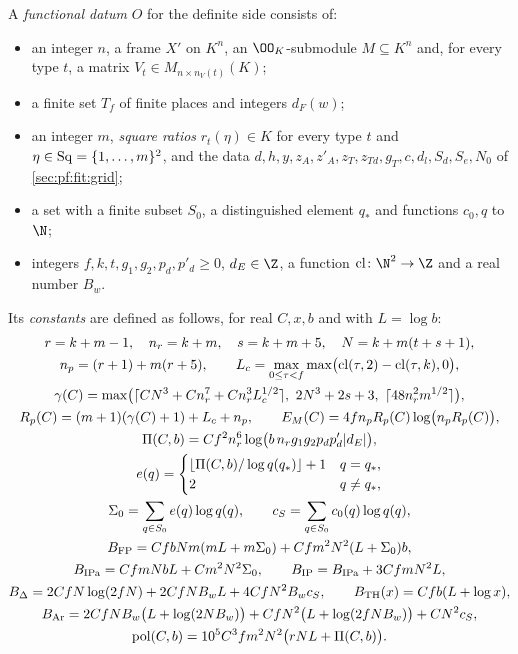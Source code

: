 \begin{definition}\label{pf:fit:fundata}
A \emph{functional datum} $O$ for the definite side consists of:
\begin{itemize}
\item an integer $n$, a frame $X'$ on $K^n$, an $\OO_K$-submodule $M\subseteq K^n$ and, for every type $t$, a matrix
$V_t\in M_{n\times n_V(t)}(K)$;
\item a finite set $T_f$ of finite places and integers $d_F(w)$;
\item an integer $m$, \emph{square ratios} $r_t(\eta)\in K$ for every type $t$ and $\eta\in\mathrm{Sq}=\{1,\dots,m\}^2$, and
the data $d,h,y,z_A,z'_A,z_T,z_{Td},g_T,c,d_l,S_d,S_e,N_0$ of \cref{sec:pf:fit:grid};
\item a set with a finite subset $S_0$, a distinguished element $q_*$ and functions $c_0,q$ to $\N$;
\item integers $f,k,t,g_1,g_2,p_d,p'_d\ge0$, $d_E\in\Z$, a function $\mathrm{cl}\colon\N^2\to\Z$ and a real number
$B_w$.
\end{itemize}
Its \emph{constants} are defined as follows, for real $C,x,b$ and with $L=\log b$:
\begin{gather*}
r=k+m-1,\quad n_r=k+m,\quad s=k+m+5,\quad N=k+m(t+s+1),\\
n_p=(r+1)+m(r+5),\qquad L_c=\max_{0\le\tau<f}\max\bigl(\mathrm{cl}(\tau,2)-\mathrm{cl}(\tau,k),0\bigr),\\
\gamma(C)=\max\bigl(\lceil CN^3+Cn_r^7+Cn_r^3L_c^{1/2}\rceil,\ 2N^3+2s+3,\ \lceil48n_r^2m^{1/2}\rceil\bigr),\\
R_p(C)=(m+1)(\gamma(C)+1)+L_c+n_p,\qquad E_M(C)=4fn_pR_p(C)\log\bigl(n_pR_p(C)\bigr),\\
\Pi(C,b)=Cf^2n_r^6\log\bigl(b\,n_rg_1g_2p_dp'_d|d_E|\bigr),\\
e(q)=\begin{cases}\lfloor\Pi(C,b)/\log q(q_*)\rfloor+1&q=q_*,\\2&q\ne q_*,\end{cases}\\
\Sigma_0=\sum_{q\in S_0}e(q)\log q(q),\qquad c_S=\sum_{q\in S_0}c_0(q)\log q(q),\\
B_{\mathrm{FP}}=CfbNm(mL+m\Sigma_0)+Cfm^2N^2(L+\Sigma_0)b,\\
B_{\mathrm{IPa}}=CfmNbL+Cm^2N^2\Sigma_0,\qquad B_{\mathrm{IP}}=B_{\mathrm{IPa}}+3CfmN^2L,\\
B_\Delta=2CfN\log(2fN)+2CfNB_wL+4CfN^2B_wc_S,\qquad B_{\mathrm{TH}}(x)=Cfb(L+\log x),\\
B_{\mathrm{Ar}}=2CfNB_w\bigl(L+\log(2NB_w)\bigr)+CfN^2\bigl(L+\log(2fNB_w)\bigr)+CN^2c_S,\\
\fitpol(C,b)=10^5C^3fm^2N^2\bigl(rNL+\Pi(C,b)\bigr).
\end{gather*}
\end{definition}

